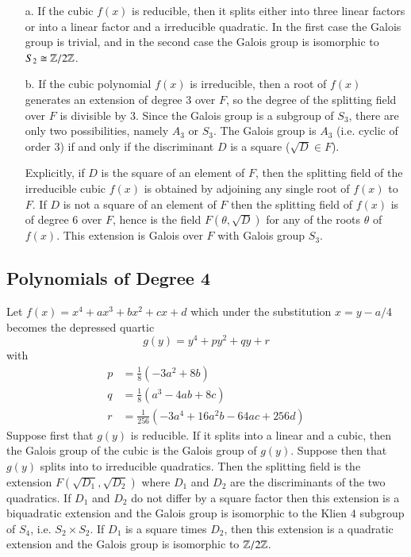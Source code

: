 \begin{enumerate}
    \item[a.] If the cubic $f(x)$ is reducible, then it splits either into three linear factors or into a linear factor and a irreducible quadratic. In the first case the Galois group is trivial, and in the second case the Galois group is isomorphic to $S_2 \cong \mathbb Z/2\mathbb Z$.
    \item[b.] If the cubic polynomial $f(x)$ is irreducible, then a root of $f(x)$ generates an extension of degree $3$ over $F$, so the degree of the splitting field over $F$ is divisible by $3$. Since the Galois group is a subgroup of $S_3$, there are only two possibilities, namely $A_3$ or $S_3$. The Galois group is $A_3$ (i.e. cyclic of order $3$) if and only if the discriminant $D$ is a square ($\sqrt{D} \in F$).

        Explicitly, if $D$ is the square of an element of $F$, then the splitting field of the irreducible cubic $f(x)$ is obtained by adjoining any single root of $f(x)$ to $F$. If $D$ is not a square of an element of $F$ then the splitting field of $f(x)$ is of degree $6$ over $F$, hence is the field $F(\theta,\sqrt{D})$ for any of the roots $\theta$ of $f(x)$. This extension is Galois over $F$ with Galois group $S_3$.
\end{enumerate}



\subsection{Polynomials of Degree 4}


Let $f(x) = x^4+ax^3+bx^2+cx+d$ which under the substitution $x = y-a/4$ becomes the depressed quartic \begin{equation*}
    g(y) = y^4 + py^2+qy+r
\end{equation*}
with \begin{align*}
    p &= \frac{1}{8}(-3a^2+8b) \\
    q &= \frac{1}{8}(a^3-4ab+8c) \\
    r &= \frac{1}{256}(-3a^4+16a^2b-64ac+256d)
\end{align*}
Suppose first that $g(y)$ is reducible. If it splits into a linear and a cubic, then the Galois group of the cubic is the Galois group of $g(y)$. Suppose then that $g(y)$ splits into to irreducible quadratics. Then the splitting field is the extension $F(\sqrt{D_1},\sqrt{D_2})$ where $D_1$ and $D_2$ are the discriminants of the two quadratics. If $D_1$ and $D_2$ do not differ by a square factor then this extension is a biquadratic extension and the Galois group is isomorphic to the Klien $4$ subgroup of $S_4$, i.e. $S_2 \times S_2$. If $D_1$ is a square times $D_2$, then this extension is a quadratic extension and the Galois group is isomorphic to $\mathbb Z/2\mathbb Z$.

